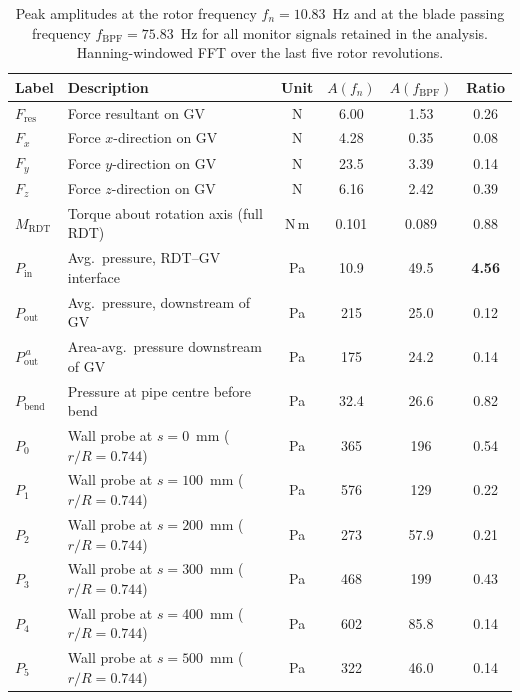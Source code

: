 \begin{table}[H]
\centering
\small
\caption{Peak amplitudes at the rotor frequency $f_n = 10.83$~Hz
and at the blade passing frequency $f_{\mathrm{BPF}} = 75.83$~Hz for
all monitor signals retained in the analysis. Hanning-windowed FFT
over the last five rotor revolutions.}
\label{tab:peak_amplitudes}
\begin{tabular}{llcccc}
\hline
Label & Description & Unit & $A(f_n)$ & $A(f_{\mathrm{BPF}})$ & Ratio \\ \hline
$F_{\mathrm{res}}$        & Force resultant on GV    & N    & 6.00  & 1.53  & 0.26 \\
$F_x$                      & Force $x$-direction on GV& N    & 4.28  & 0.35  & 0.08 \\
$F_y$                      & Force $y$-direction on GV& N    & 23.5  & 3.39  & 0.14 \\
$F_z$                      & Force $z$-direction on GV& N    & 6.16  & 2.42  & 0.39 \\
$M_{\mathrm{RDT}}$         & Torque about rotation axis (full RDT) & N\,m & 0.101 & 0.089 & 0.88 \\ \hline
$P_{\mathrm{in}}$          & Avg.\ pressure, RDT--GV interface   & Pa & 10.9 & 49.5 & \textbf{4.56} \\
$P_{\mathrm{out}}$         & Avg.\ pressure, downstream of GV    & Pa & 215  & 25.0 & 0.12 \\
$P_{\mathrm{out}}^{\,a}$   & Area-avg.\ pressure downstream of GV & Pa & 175 & 24.2 & 0.14 \\ \hline
$P_{\mathrm{bend}}$        & Pressure at pipe centre before bend & Pa & 32.4 & 26.6 & 0.82 \\ \hline
$P_0$ & Wall probe at $s = 0$~mm    ($r/R = 0.744$) & Pa & 365 & 196  & 0.54 \\
$P_1$ & Wall probe at $s = 100$~mm  ($r/R = 0.744$) & Pa & 576 & 129  & 0.22 \\
$P_2$ & Wall probe at $s = 200$~mm  ($r/R = 0.744$) & Pa & 273 & 57.9 & 0.21 \\
$P_3$ & Wall probe at $s = 300$~mm  ($r/R = 0.744$) & Pa & 468 & 199  & 0.43 \\
$P_4$ & Wall probe at $s = 400$~mm  ($r/R = 0.744$) & Pa & 602 & 85.8 & 0.14 \\
$P_5$ & Wall probe at $s = 500$~mm  ($r/R = 0.744$) & Pa & 322 & 46.0 & 0.14 \\ \hline
\end{tabular}
\end{table}

